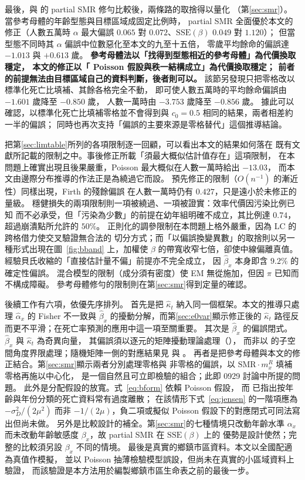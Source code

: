 \documentclass[UTF8, fontset=macnew, a4paper, 12pt]{ctexart}
\begin{document}
最後，與 \citet{lee2003}的 partial SMR 修勻比較後，兩條路的取捨得以量化
（第\ref{sec:smr}）。當參考母體的年齡型態與目標區域成固定比例時，
partial SMR 全面優於本文的修正（人數五萬時 $\alpha$ 最大偏誤 $0.065$
對 $0.072$、$\mathrm{SSE}(\beta)$ $0.049$ 對 $1.120$）；
但當型態不同時其 $\alpha$ 偏誤中位數惡化至本文的九至十五倍，
零歲平均餘命的偏誤達 $-1.013$ 與 $+0.613$ 歲。
\textbf{參考母體法以「找得到型態相近的參考母體」為代價換取穩定，
本文的修正以「 Poisson 假設與秩一結構成立」為代價換取穩定；
前者的前提無法由目標區域自己的資料判斷，後者則可以。}
該節另發現只把零格改以標準化死亡比填補、其餘各格完全不動，
即可使人數五萬時的平均餘命偏誤由 $-1.601$ 歲降至 $-0.850$ 歲，
人數一萬時由 $-3.753$ 歲降至 $-0.856$ 歲。
據此可以確認，以標準化死亡比填補零格並不會得到與
$c_0=0.5$ 相同的結果，兩者相差約一半的偏誤；
同時也再次支持「偏誤的主要來源是零格替代」這個推導結論。

把第\ref{sec:limtable}所列的各項限制逐一回顧，可以看出本文的結果如何落在
既有文獻所記載的限制之中。事後修正所載「須最大概似估計值存在」這項限制，
在本問題上確實出現且後果嚴重，Poisson 最大概似在人數一萬時給出 $-13.03$，
而本文由邊際分布推導的作法正是為繞過它而設。
預先修正的限制（$O(n^{-1})$ 的漸近性）同樣出現，Firth 的殘餘偏誤
在人數一萬時仍有 $0.427$，只是遠小於未修正的量級。
穩健損失的兩項限制則一項被繞過、一項被證實：效率代價因污染比例已知
而不必承受，但「污染為少數」的前提在幼年組明確不成立，其比例達 $0.74$，
超過崩潰點所允許的 $50\%$。
正則化的調參限制在本問題上格外嚴重，因為 LC 的跨格借力使交叉驗證無合法的
切分方式；而「以偏誤換變異數」的取捨則以另一種形式出現在圖~\ref{fig:bband}
上，加權使 $\beta$ 的帶寬收窄七倍，卻使中線偏離真值。
經驗貝氏收縮的「直接估計量不偏」前提亦不完全成立，
因 $\hat\beta_x$ 本身即含 $9.2\%$ 的確定性偏誤。
混合模型的限制（成分須有密度）使 EM 無從施加，但因 $\pi$ 已知而不構成障礙。
參考母體修勻的限制則在第\ref{sec:smr}得到定量的確認。

後續工作有六項，依優先序排列。
首先是把 $\hat\kappa_t$ 納入同一個框架。本文的推導只處理 $\hat\alpha_x$ 的
Fisher 不一致與 $\hat\beta_x$ 的擾動分解，而第\ref{sec:e0var}顯示修正後的
$\hat\kappa_t$ 路徑反而更不平滑；在死亡率預測的應用中這一項至關重要。
其次是 $\hat\beta_x$ 的偏誤閉式。$\hat\beta_x$ 與 $\hat\kappa_t$ 為奇異向量，
其偏誤須以逐元的矩陣擾動理論處理（\citealp{abbe2020}），
而非以 \citet{caizhang2018} 的子空間角度界限處理；隨機矩陣一側的對應結果見 \citet{benaych2012} 與 \citet{zhang2022}。
再者是把參考母體與本文的修正結合。第\ref{sec:smr}顯示兩者分別處理零格與
非零格的偏誤，以 $\mathrm{SMR}\cdot m^{R}_x$ 填補零格再施以中心化，
是一個自然且可立即檢驗的組合；此即 0929 討論中所提的問題。
此外是分配假設的放寬。式~\eqref{eq:bform} 依賴 Poisson 假設，
而 \citet{djeundje2010}已指出按年齡與年份分類的死亡資料常有過度離散；
在該情形下式~\eqref{eq:jensen} 的一階項應為 $-\sigma_D^2/(2\mu^2)$
而非 $-1/(2\mu)$，負二項或擬似 Poisson 假設下的對應閉式可同法寫出但尚未做。
另外是比較設計的補全。第\ref{sec:smr}的七種情境只改動年齡水準 $\alpha_x$
而未改動年齡敏感度 $\beta_x$，故 partial SMR 在 $\mathrm{SSE}(\beta)$ 上的
優勢是設計使然；完整的比較須另設 $\beta_x$ 不同的情境。
最後是真實的鄉鎮市區資料。本文以全國配適為真值作模擬，
並以 Poisson 抽薄檢驗模型誤設，但尚未在真實的小區域資料上驗證，
而該驗證是本方法用於編製鄉鎮市區生命表之前的最後一步。
\end{document}

